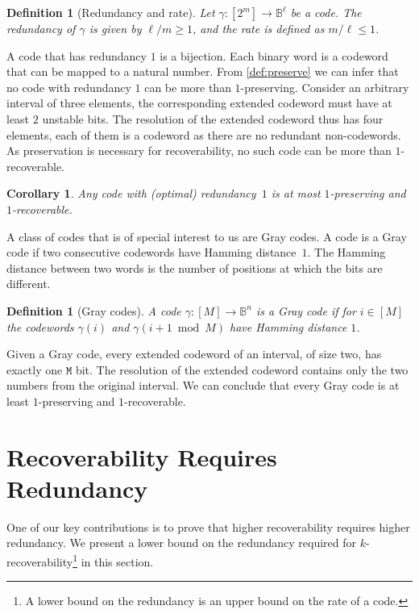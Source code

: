 \documentclass[9pt,journal,compsoc]{IEEEtran}
\newtheorem{corollary}[theorem]{Corollary}
\newtheorem{definition}[theorem]{Definition}
\theoremstyle{remark}
\newcommand{\mfu}{\mathtt{M}}
\newcommand{\IB}{\mathbb{B}}
\begin{document}
\begin{definition}[Redundancy and rate]\label{def:redun}
Let $\gamma \colon [2^m] \rightarrow \IB^\ell$ be a code. 
The \emph{redundancy} of $\gamma$ is given by $\ell/m \geq 1$, and the
\emph{rate} is defined as $m/\ell \leq 1$.
\end{definition}
 
A code that has redundancy $1$ is a bijection. 
Each binary word is a codeword that can be mapped to a natural number. 
From \cref{def:preserve} we can infer that no code with redundancy $1$ 
  can be more than $1$-preserving.
Consider an arbitrary interval of three elements, the corresponding 
   extended codeword must have at least $2$ unstable bits. The 
   resolution of the extended codeword thus has four elements, each 
   of them is a codeword as there are no redundant non-codewords.
As preservation is necessary for recoverability, no such code can be more than $1$-recoverable.

\begin{corollary}\label{col:optrate}
  Any code with (optimal) redundancy~$1$ is at most $1$-preserving and $1$-recoverable.
\end{corollary}

A class of codes that is of special interest to us are Gray codes.
A code is a Gray code if two consecutive codewords have Hamming 
  distance~$1$.
The Hamming distance between two words is the number of positions at which the
  bits are different.

\begin{definition}[Gray codes]\label{def:grayprop}
  A code $\gamma\colon[M]\rightarrow\IB^n$ is a Gray code if
  for $i\in[M]$ the codewords $\gamma(i)$ and $\gamma(i+1 \bmod M)$ have
  Hamming distance $1$.
\end{definition}

Given a Gray code, every extended codeword of an interval,
  of size two, has exactly one $\mfu$ bit.
The resolution of the extended codeword contains only the
  two numbers from the original interval.
We can conclude that every Gray code is at least $1$-preserving 
  and $1$-recoverable.

\section{Recoverability Requires Redundancy}\label{sec:lowerbound}

One of our key contributions is to prove that higher recoverability requires
  higher redundancy.
We present a lower bound on the redundancy required for
  $k$-recoverability\footnote{A lower bound on the redundancy is an upper bound on the rate of a code.}
  in this section.
\end{document}
